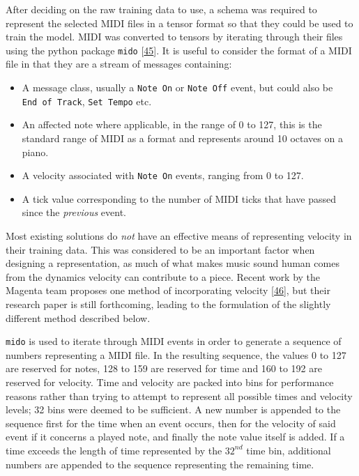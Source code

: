 \documentclass[12pt,]{article}
\providecommand{\tightlist}{%
  \setlength{\itemsep}{0pt}\setlength{\parskip}{0pt}}
\begin{document}
After deciding on the raw training data to use, a schema was required to
represent the selected MIDI files in a tensor format so that they could
be used to train the model. MIDI was converted to tensors by iterating
through their files using the python package \texttt{mido}
{[}\protect\hyperlink{ref-mido}{45}{]}. It is useful to consider the
format of a MIDI file in that they are a stream of messages containing:

\begin{itemize}
\tightlist
\item
  A message class, usually a \texttt{Note\ On} or \texttt{Note\ Off}
  event, but could also be \texttt{End\ of\ Track}, \texttt{Set\ Tempo}
  etc.
\item
  An affected note where applicable, in the range of 0 to 127, this is
  the standard range of MIDI as a format and represents around 10
  octaves on a piano.
\item
  A velocity associated with \texttt{Note\ On} events, ranging from 0 to
  127.
\item
  A tick value corresponding to the number of MIDI ticks that have
  passed since the \emph{previous} event.
\end{itemize}

Most existing solutions do \emph{not} have an effective means of
representing velocity in their training data. This was considered to be
an important factor when designing a representation, as much of what
makes music sound human comes from the dynamics velocity can contribute
to a piece. Recent work by the Magenta team proposes one method of
incorporating velocity
{[}\protect\hyperlink{ref-performance-rnn-2017}{46}{]}, but their
research paper is still forthcoming, leading to the formulation of the
slightly different method described below.

\texttt{mido} is used to iterate through MIDI events in order to
generate a sequence of numbers representing a MIDI file. In the
resulting sequence, the values 0 to 127 are reserved for notes, 128 to
159 are reserved for time and 160 to 192 are reserved for velocity. Time
and velocity are packed into bins for performance reasons rather than
trying to attempt to represent all possible times and velocity levels;
32 bins were deemed to be sufficient. A new number is appended to the
sequence first for the time when an event occurs, then for the velocity
of said event if it concerns a played note, and finally the note value
itself is added. If a time exceeds the length of time represented by the
\(32^{nd}\) time bin, additional numbers are appended to the sequence
representing the remaining time.
\end{document}
